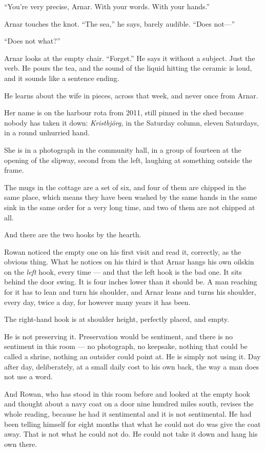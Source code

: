 \documentclass[11pt,oneside]{book}
\newcommand{\sceneline}{%
  \par\vspace{1.2em}
  \begin{center}
    \fontsize{11}{11}\selectfont \textbullet\quad\textbullet\quad\textbullet
  \end{center}
  \vspace{0.6em}\noindent\ignorespaces
}
\begin{document}
``You're very precise, Arnar. With your words. With your hands.''

Arnar touches the knot. ``The sea,'' he says, barely audible. ``Does
not---''

``Does not what?''

Arnar looks at the empty chair. ``Forget.'' He says it without a
subject. Just the verb. He pours the tea, and the sound of the liquid
hitting the ceramic is loud, and it sounds like a sentence ending.

\sceneline

He learns about the wife in pieces, across that week, and never once
from Arnar.

Her name is on the harbour rota from 2011, still pinned in the shed
because nobody has taken it down: \emph{Kristbjörg,} in the Saturday
column, eleven Saturdays, in a round unhurried hand.

She is in a photograph in the community hall, in a group of fourteen at
the opening of the slipway, second from the left, laughing at something
outside the frame.

The mugs in the cottage are a set of six, and four of them are chipped
in the same place, which means they have been washed by the same hands
in the same sink in the same order for a very long time, and two of them
are not chipped at all.

And there are the two hooks by the hearth.

Rowan noticed the empty one on his first visit and read it, correctly,
as the obvious thing. What he notices on his third is that Arnar hangs
his own oilskin on the \emph{left} hook, every time --- and that the left
hook is the bad one. It sits behind the door swing. It is four inches
lower than it should be. A man reaching for it has to lean and turn his
shoulder, and Arnar leans and turns his shoulder, every day, twice a
day, for however many years it has been.

The right-hand hook is at shoulder height, perfectly placed, and empty.

He is not preserving it. Preservation would be sentiment, and there is
no sentiment in this room --- no photograph, no keepsake, nothing that
could be called a shrine, nothing an outsider could point at. He is
simply not using it. Day after day, deliberately, at a small daily cost
to his own back, the way a man does not use a word.

And Rowan, who has stood in this room before and looked at the empty
hook and thought about a navy coat on a door nine hundred miles south,
revises the whole reading, because he had it sentimental and it is not
sentimental. He had been telling himself for eight months that what he
could not do was give the coat away. That is not what he could not do.
He could not take it down and hang his own there.
\end{document}
